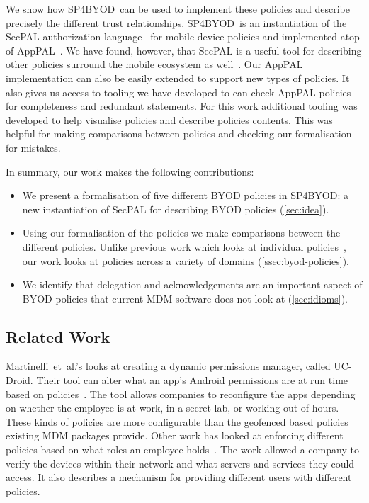 \documentclass{llncs}
\makeatletter
\newcommand{\etal}{et~al.\@}
\newcommand{\AppPAL}[0]{SP4BYOD}
\makeatother
\begin{document}
We show how \AppPAL~can be used to implement these policies and describe precisely the different trust relationships.
\AppPAL~is an instantiation of the SecPAL authorization language~\cite{becker_secpal:_2010} for mobile device policies and implemented atop of AppPAL~\cite{hallett_apppal_2016}.
We have found, however, that SecPAL is a useful tool for describing other policies surround the mobile ecosystem as well~\cite{hallett_specifying_2016}.
Our AppPAL implementation can also be easily extended to support new types of policies.
It also gives us access to tooling we have developed to can check AppPAL policies for completeness and redundant statements.
For this work additional tooling was developed to help visualise policies and describe policies contents.
This was helpful for making comparisons between policies and checking our formalisation for mistakes. 


In summary, our work makes the following contributions:

\begin{itemize}
  \item We present a formalisation of five different BYOD policies in \AppPAL: a new instantiation of SecPAL for describing BYOD policies (\autoref{sec:idea}).
  \item Using our formalisation of the policies we make comparisons between the different policies. 
    Unlike previous work which looks at individual policies~\cite{armando_developing_2016}, our work looks at policies across a variety of domains (\autoref{ssec:byod-policies}).
  \item We identify that delegation and acknowledgements are an important aspect of BYOD policies that current MDM software does not look at (\autoref{sec:idioms}).
\end{itemize}


\subsection{Related Work}
\label{sec:related}

Martinelli~\etal{}'s looks at creating a dynamic permissions manager, called UC-Droid.
Their tool can alter what an app's Android permissions are at run time based on policies~\cite{martinelli_enhancing_2016}.
The tool allows companies to reconfigure the apps depending on whether the employee is at work, in a secret lab, or working out-of-hours.
These kinds of policies are more configurable than the geofenced based policies existing MDM packages provide.
Other work has looked at enforcing different policies based on what roles an employee holds~\cite{costantino_towards_2013}.
The work allowed a company to verify the devices within their network and what servers and services they could access.
It also describes a mechanism for providing different users with different policies.
\end{document}
